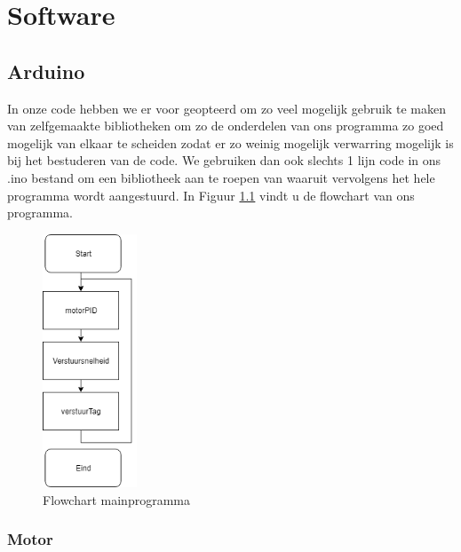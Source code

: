 
\chapter{Software}

\section{Arduino}

In onze code hebben we er voor geopteerd om zo veel mogelijk gebruik te maken van zelfgemaakte bibliotheken om zo de onderdelen van ons programma zo goed mogelijk van elkaar te scheiden zodat er zo weinig mogelijk verwarring mogelijk is bij het bestuderen van de code. We gebruiken dan ook slechts 1 lijn code in ons .ino bestand om een bibliotheek aan te roepen van waaruit vervolgens het hele programma wordt aangestuurd. In Figuur \ref{fig:flowchart} vindt u de flowchart van ons programma.

\begin{figure}[h]
\centering
\includegraphics[width=0.25\textwidth]{mainFlowchart.png}
\caption{Flowchart mainprogramma}
\label{fig:flowchart}
\end{figure}


\subsection{Motor}

